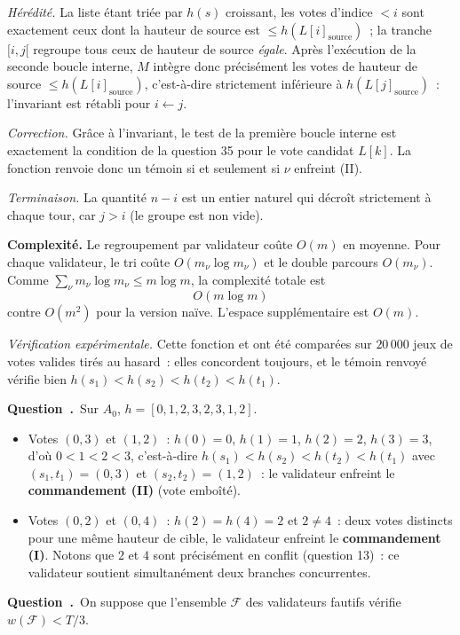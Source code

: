 \documentclass[11pt,a4paper]{article}
\renewcommand{\Q}{\medskip\par\stepcounter{qcnt}\noindent\textbf{\color{cnc}Question~\theqcnt.}~}
\begin{document}
\emph{Hérédité.} La liste étant triée par $h(s)$ croissant, les votes d'indice $<i$ sont
exactement ceux dont la hauteur de source est $\le h(L[i]_{\text{source}})$~; la tranche
$[i,j[$ regroupe tous ceux de hauteur de source \emph{égale}. Après l'exécution de la seconde
boucle interne, $M$ intègre donc précisément les votes de hauteur de source
$\le h(L[i]_{\text{source}})$, c'est-à-dire strictement inférieure à
$h(L[j]_{\text{source}})$~: l'invariant est rétabli pour $i\leftarrow j$.

\emph{Correction.} Grâce à l'invariant, le test  de la première boucle
interne est exactement la condition de la question 35 pour le vote candidat $L[k]$. La
fonction renvoie donc un témoin si et seulement si $\nu$ enfreint (II).

\emph{Terminaison.} La quantité $n-i$ est un entier naturel qui décroît strictement à chaque
tour, car $j>i$ (le groupe est non vide).

\textbf{Complexité.} Le regroupement par validateur coûte $O(m)$ en moyenne. Pour chaque
validateur, le tri coûte $O(m_\nu\log m_\nu)$ et le double parcours $O(m_\nu)$. Comme
$\sum_\nu m_\nu\log m_\nu \le m\log m$, la complexité totale est
\[ \boxed{O(m\log m)} \]
contre $O(m^2)$ pour la version naïve. L'espace supplémentaire est $O(m)$.

\emph{Vérification expérimentale.} Cette fonction et  ont été
comparées sur $20\,000$ jeux de votes valides tirés au hasard~: elles concordent toujours, et
le témoin renvoyé vérifie bien $h(s_1)<h(s_2)<h(t_2)<h(t_1)$.

\Q Sur $A_0$, $h=[0,1,2,3,2,3,1,2]$.
\begin{itemize}[leftmargin=1.4em,itemsep=2pt]
\item Votes $(0,3)$ et $(1,2)$~: $h(0)=0$, $h(1)=1$, $h(2)=2$, $h(3)=3$, d'où
$0<1<2<3$, c'est-à-dire $h(s_1)<h(s_2)<h(t_2)<h(t_1)$ avec $(s_1,t_1)=(0,3)$ et
$(s_2,t_2)=(1,2)$~: le validateur enfreint le \textbf{commandement (II)} (vote emboîté).
\item Votes $(0,2)$ et $(0,4)$~: $h(2)=h(4)=2$ et $2\ne 4$~: deux votes distincts pour une
même hauteur de cible, le validateur enfreint le \textbf{commandement (I)}. Notons que $2$ et
$4$ sont précisément en conflit (question 13)~: ce validateur soutient simultanément deux
branches concurrentes.
\end{itemize}

\Q On suppose que l'ensemble $\mathcal{F}$ des validateurs fautifs vérifie
$w(\mathcal{F})<T/3$.
\end{document}
